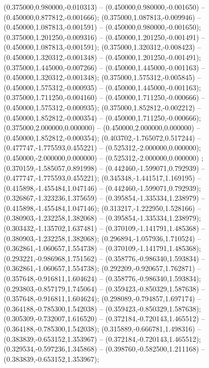  (0.375000,0.980000,-0.010313) -- (0.450000,0.980000,-0.001650) -- (0.450000,0.877812,-0.001666);
 (0.375000,1.087813,-0.009946) -- (0.450000,1.087813,-0.001591) -- (0.450000,0.980000,-0.001650);
 (0.375000,1.201250,-0.009316) -- (0.450000,1.201250,-0.001491) -- (0.450000,1.087813,-0.001591);
 (0.375000,1.320312,-0.008423) -- (0.450000,1.320312,-0.001348) -- (0.450000,1.201250,-0.001491);
 (0.375000,1.445000,-0.007266) -- (0.450000,1.445000,-0.001163) -- (0.450000,1.320312,-0.001348);
 (0.375000,1.575312,-0.005845) -- (0.450000,1.575312,-0.000935) -- (0.450000,1.445000,-0.001163);
 (0.375000,1.711250,-0.004160) -- (0.450000,1.711250,-0.000666) -- (0.450000,1.575312,-0.000935);
 (0.375000,1.852812,-0.002212) -- (0.450000,1.852812,-0.000354) -- (0.450000,1.711250,-0.000666);
 (0.375000,2.000000,0.000000) -- (0.450000,2.000000,0.000000) -- (0.450000,1.852812,-0.000354);
 (0.403702,-1.765072,0.517244) -- (0.477747,-1.775593,0.455221) -- (0.525312,-2.000000,0.000000);
 (0.450000,-2.000000,0.000000) -- (0.525312,-2.000000,0.000000) ;
 (0.370159,-1.585057,0.891998) -- (0.442460,-1.599071,0.792939) -- (0.477747,-1.775593,0.455221);
 (0.345348,-1.441517,1.169195) -- (0.415898,-1.455484,1.047146) -- (0.442460,-1.599071,0.792939);
 (0.326867,-1.323236,1.375659) -- (0.395854,-1.335334,1.238979) -- (0.415898,-1.455484,1.047146);
 (0.313217,-1.222950,1.528166) -- (0.380903,-1.232258,1.382068) -- (0.395854,-1.335334,1.238979);
 (0.303432,-1.135702,1.637481) -- (0.370109,-1.141791,1.485368) -- (0.380903,-1.232258,1.382068);
 (0.296894,-1.057936,1.710524) -- (0.362861,-1.060657,1.554738) -- (0.370109,-1.141791,1.485368);
 (0.293221,-0.986968,1.751562) -- (0.358776,-0.986340,1.593834) -- (0.362861,-1.060657,1.554738);
 (0.292209,-0.920657,1.762871) -- (0.357648,-0.916811,1.604624) -- (0.358776,-0.986340,1.593834);
 (0.293803,-0.857179,1.745064) -- (0.359423,-0.850329,1.587638) -- (0.357648,-0.916811,1.604624);
 (0.298089,-0.794857,1.697174) -- (0.364188,-0.785300,1.542038) -- (0.359423,-0.850329,1.587638);
 (0.305309,-0.732007,1.616520) -- (0.372184,-0.720143,1.465512) -- (0.364188,-0.785300,1.542038);
 (0.315889,-0.666781,1.498316) -- (0.383839,-0.653152,1.353967) -- (0.372184,-0.720143,1.465512);
 (0.329534,-0.597236,1.345868) -- (0.398760,-0.582500,1.211168) -- (0.383839,-0.653152,1.353967);
